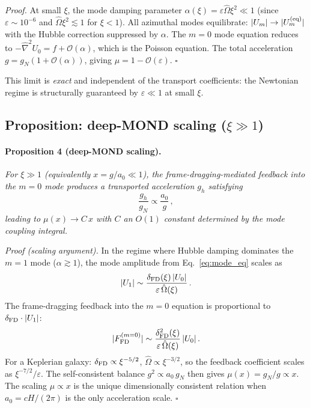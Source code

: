 \documentclass[11pt]{article}
\begin{document}
\textit{Proof.}
At small $\xi$, the mode damping parameter
$\alpha(\xi) = \varepsilon\hat\Omega\xi^{2} \ll 1$
(since $\varepsilon \sim 10^{-6}$ and $\hat\Omega\xi^{2}
\lesssim 1$ for $\xi < 1$).  All azimuthal modes
equilibrate:
$|U_m| \to |U_m^{(\rm eq)}|$ with the Hubble correction
suppressed by $\alpha$.  The $m=0$ mode equation reduces to
$-\hat\nabla^{2}U_0 = f + \mathcal{O}(\alpha)$,
which is the Poisson equation.
The total acceleration $g = g_N(1 + \mathcal{O}(\alpha))$,
giving $\mu = 1 - \mathcal{O}(\varepsilon)$.
\hfill$\square$

This limit is \emph{exact} and independent of the transport
coefficients: the Newtonian regime is structurally guaranteed
by $\varepsilon \ll 1$ at small $\xi$.

\subsection[Proposition: deep-MOND scaling (xi much greater than 1)]{Proposition: deep-MOND scaling ($\xi \gg 1$)}
\label{sec:mond_limit}

\paragraph{Proposition 4 (deep-MOND scaling).}
\textit{For $\xi \gg 1$ (equivalently $x = g/a_0 \ll 1$),
the frame-dragging-mediated feedback into the $m=0$ mode
produces a transported acceleration $g_h$ satisfying
\begin{equation}
\frac{g_h}{g_N} \propto \frac{a_0}{g}\,,
\label{eq:deep_scaling}
\end{equation}
leading to $\mu(x) \to C\,x$ with $C$ an $O(1)$ constant
determined by the mode coupling integral.}

\textit{Proof (scaling argument).}
In the regime where Hubble damping dominates the $m=1$
mode ($\alpha \gtrsim 1$), the mode amplitude from
Eq.~\eqref{eq:mode_eq} scales as
\begin{equation}
|U_1| \sim
  \frac{\delta_{\rm FD}(\xi)\,|U_0|}
      {\varepsilon\,\hat\Omega(\xi)}\,.
\label{eq:U1_scaling}
\end{equation}
The frame-dragging feedback into the $m=0$ equation
is proportional to $\delta_{\rm FD}\cdot|U_1|$:
\begin{equation}
|F_{\rm FD}^{(m=0)}|
\sim \frac{\delta_{\rm FD}^{2}(\xi)}
          {\varepsilon\,\hat\Omega(\xi)}\,|U_0|\,.
\label{eq:feedback_scaling}
\end{equation}
For a Keplerian galaxy:
$\delta_{\rm FD} \propto \xi^{-5/2}$,
$\hat\Omega \propto \xi^{-3/2}$, so the feedback
coefficient scales as $\xi^{-7/2}/\varepsilon$.
The self-consistent balance $g^{2} \propto a_0\,g_N$
then gives $\mu(x) = g_N/g \propto x$.
The scaling $\mu \propto x$ is the unique
dimensionally consistent relation when $a_0 = cH/(2\pi)$
is the only acceleration scale.
\hfill$\square$
\end{document}
